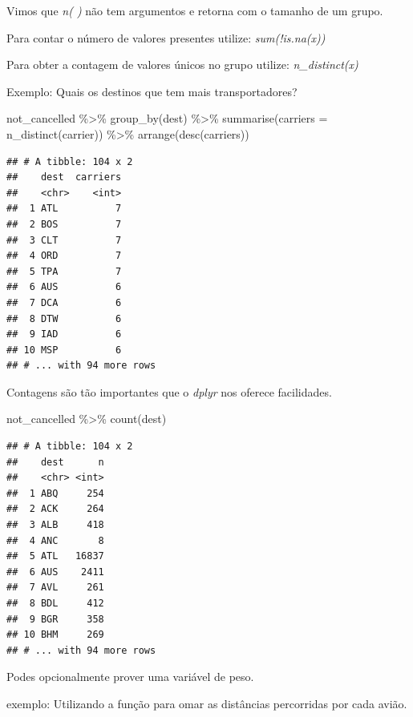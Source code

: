 \documentclass[
]{article}
\newenvironment{Shaded}{\begin{snugshade}}{\end{snugshade}}
\newcommand{\AttributeTok}[1]{\textcolor[rgb]{0.77,0.63,0.00}{#1}}
\newcommand{\FunctionTok}[1]{\textcolor[rgb]{0.00,0.00,0.00}{#1}}
\newcommand{\NormalTok}[1]{#1}
\newcommand{\SpecialCharTok}[1]{\textcolor[rgb]{0.00,0.00,0.00}{#1}}
\begin{document}
Vimos que \emph{n( )} não tem argumentos e retorna com o tamanho de um
grupo.

Para contar o número de valores presentes utilize: \emph{sum(!is.na(x))}

Para obter a contagem de valores únicos no grupo utilize:
\emph{n\_distinct(x)}

Exemplo: Quais os destinos que tem mais transportadores?

\begin{Shaded}
\begin{Highlighting}[]
\NormalTok{not\_cancelled }\SpecialCharTok{\%\textgreater{}\%} 
  \FunctionTok{group\_by}\NormalTok{(dest) }\SpecialCharTok{\%\textgreater{}\%} 
  \FunctionTok{summarise}\NormalTok{(}\AttributeTok{carriers =} \FunctionTok{n\_distinct}\NormalTok{(carrier)) }\SpecialCharTok{\%\textgreater{}\%} 
  \FunctionTok{arrange}\NormalTok{(}\FunctionTok{desc}\NormalTok{(carriers))}
\end{Highlighting}
\end{Shaded}

\begin{verbatim}
## # A tibble: 104 x 2
##    dest  carriers
##    <chr>    <int>
##  1 ATL          7
##  2 BOS          7
##  3 CLT          7
##  4 ORD          7
##  5 TPA          7
##  6 AUS          6
##  7 DCA          6
##  8 DTW          6
##  9 IAD          6
## 10 MSP          6
## # ... with 94 more rows
\end{verbatim}

Contagens são tão importantes que o \emph{dplyr} nos oferece
facilidades.

\begin{Shaded}
\begin{Highlighting}[]
\NormalTok{not\_cancelled }\SpecialCharTok{\%\textgreater{}\%} 
  \FunctionTok{count}\NormalTok{(dest)}
\end{Highlighting}
\end{Shaded}

\begin{verbatim}
## # A tibble: 104 x 2
##    dest      n
##    <chr> <int>
##  1 ABQ     254
##  2 ACK     264
##  3 ALB     418
##  4 ANC       8
##  5 ATL   16837
##  6 AUS    2411
##  7 AVL     261
##  8 BDL     412
##  9 BGR     358
## 10 BHM     269
## # ... with 94 more rows
\end{verbatim}

Podes opcionalmente prover uma variável de peso.

exemplo: Utilizando a função para omar as distâncias percorridas por
cada avião.
\end{document}
